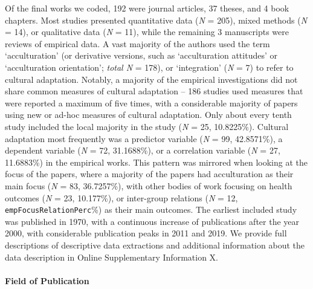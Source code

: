 Of the final works we coded, 192 were journal articles, 37 theses, and 4
book chapters. Most studies presented quantitative data (\textit{N} =
205), mixed methods (\textit{N} = 14), or qualitative data (\textit{N} =
11), while the remaining 3 manuscripts were reviews of empirical data. A
vast majority of the authors used the term `acculturation' (or
derivative versions, such as `acculturation attitudes' or `acculturation
orientation'; \textit{total N} = 178), or `integration' (\textit{N} = 7)
to refer to cultural adaptation. Notably, a majority of the empirical
investigations did not share common measures of cultural adaptation --
186 studies used measures that were reported a maximum of five times,
with a considerable majority of papers using new or ad-hoc measures of
cultural adaptation. Only about every tenth study included the local
majority in the study (\textit{N} = 25, 10.8225\%). Cultural adaptation
most frequently was a predictor variable (\textit{N} = 99, 42.8571\%), a
dependent variable (\textit{N} = 72, 31.1688\%), or a correlation
variable (\textit{N} = 27, 11.6883\%) in the empirical works. This
pattern was mirrored when looking at the focus of the papers, where a
majority of the papers had acculturation as their main focus (\textit{N}
= 83, 36.7257\%), with other bodies of work focusing on health outcomes
(\textit{N} = 23, 10.177\%), or inter-group relations (\textit{N} = 12,
\texttt{empFocusRelationPerc}\%) as their main outcomes. The earliest
included study was published in 1970, with a continuous increase of
publications after the year 2000, with considerable publication peaks in
2011 and 2019. We provide full descriptions of descriptive data
extractions and additional information about the data description in
Online Supplementary Information X.

\paragraph{Field of Publication}

